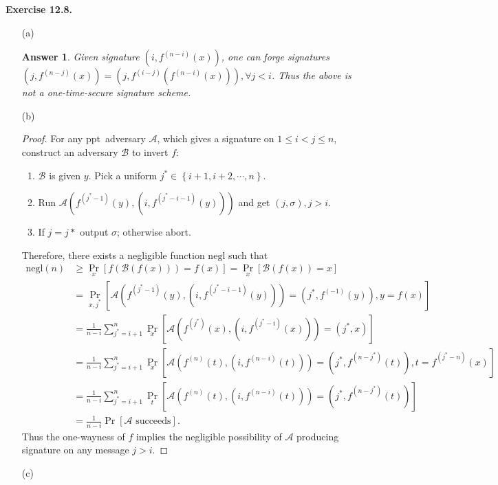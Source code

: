 \documentclass[a4paper]{article}
\newtheorem*{proof}{Proof}
\newtheorem*{answer}{Answer}
\newenvironment{exercise}[1]{
	\par
	\noindent\textbf{Exercise #1.}\quad
}{
	\par
	\bigskip
}
\newcommand{\pbra}[1]{\left( #1 \right)}
\newcommand{\cbra}[1]{\left\{ #1 \right\}}
\newcommand{\sbra}[1]{\left[ #1 \right]}
\newcommand{\negl}{\mathrm{negl}}
\newcommand{\ppt}{{\sc ppt}~}
\newcommand{\Acal}{\mathcal{A}}
\newcommand{\Bcal}{\mathcal{B}}
\begin{document}
\begin{exercise}{12.8}
\begin{itemize}
    \item[(a)] 
        \begin{answer}
            Given signature $(i,f^{(n-i)}(x))$, one can forge signatures
            $(j,f^{(n-j)}(x))=(j,f^{(i-j)}(f^{(n-i)}(x))),\forall j<i$.
            Thus the above is not a one-time-secure signature scheme.
        \end{answer}
    \item[(b)] 
        \begin{proof}
            For any \ppt adversary $\Acal$, which gives a signature on $1\leq i<j\leq n$, 
            construct an adversary $\Bcal$ to invert $f$:
            \begin{enumerate}
                \item $\Bcal$ is given $y$. Pick a uniform $j^*\in\cbra{i+1,i+2,\cdots,n}$.
                \item Run $\Acal\pbra{f^{(j^*-1)}(y),(i,f^{(j^*-i-1)}(y))}$ and get $(j,\sigma),j>i$.
                \item If $j=j*$ output $\sigma$; otherwise abort.
            \end{enumerate}
            Therefore, there exists a negligible function $\negl$ such that
            \begin{align*}
                \negl(n)&\geq\Pr_x\sbra{f(\Bcal(f(x)))=f(x)}=\Pr_x\sbra{\Bcal(f(x))=x}\\
                &=\Pr_{x,j^*}\sbra{\Acal\pbra{f^{(j^*-1)}(y),(i,f^{(j^*-i-1)}(y))}=(j^*,f^{(-1)}(y)),y=f(x)}\\
                &=\frac1{n-i}\sum_{j^*=i+1}^n
                \Pr_x\sbra{\Acal\pbra{f^{(j^*)}(x),(i,f^{(j^*-i)}(x))}=(j^*,x)}\\
                &=\frac1{n-i}\sum_{j^*=i+1}^n
                \Pr_x\sbra{\Acal\pbra{f^{(n)}(t),(i,f^{(n-i)}(t))}=(j^*,f^{(n-j^*)}(t)),t=f^{(j^*-n)}(x)}\\
                &=\frac1{n-i}\sum_{j^*=i+1}^n
                \Pr_t\sbra{\Acal\pbra{f^{(n)}(t),(i,f^{(n-i)}(t))}=(j^*,f^{(n-j^*)}(t))}\\
                &=\frac1{n-i}\Pr\sbra{\Acal\text{ succeeds}}.
            \end{align*}
            Thus the one-wayness of $f$ implies the negligible possibility of 
            $\Acal$ producing signature on any message $j>i$.
        \end{proof}
    \item[(c)] 

\end{itemize}
\end{exercise}
\end{document}
